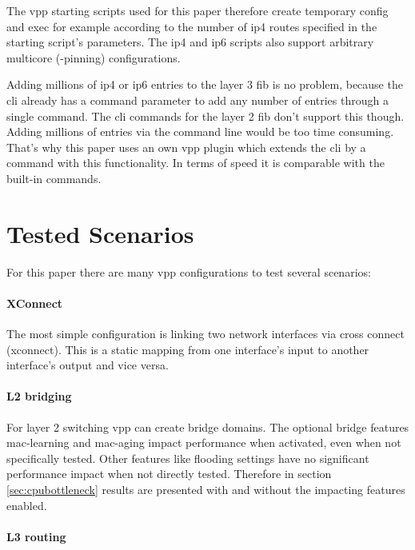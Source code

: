 The \Ac{vpp} starting scripts used for this paper therefore create
temporary \Ac{config} and \Ac{exec} for example according to the
number of \Ac{ip4} routes specified in the starting script's
parameters. The \Ac{ip4} and \Ac{ip6} scripts also support arbitrary
multicore (-pinning) configurations.


Adding millions of \Ac{ip4} or \Ac{ip6} entries to the layer 3
\Ac{fib} is no problem, because the \Ac{cli} already has a command
parameter to add any number of entries through a single command. The
\Ac{cli} commands for the layer 2 \Ac{fib} don't support this though.
Adding millions of entries via the command line would be too time
consuming. That's why this paper uses an own \Ac{vpp} plugin which
extends the \Ac{cli} by a command with this functionality. In terms of
speed it is comparable with the built-in commands.


\section{Tested Scenarios}

For this paper there are many \Ac{vpp} configurations to test several
scenarios:

\paragraph{XConnect} 

The most simple configuration is linking two network interfaces via
cross connect (xconnect). This is a static mapping from one
interface's input to another interface's output and vice versa.

\paragraph{L2 bridging}

For layer 2 switching \Ac{vpp} can create bridge domains. The optional
bridge features mac-learning and mac-aging impact performance when
activated, even when not specifically tested. Other features like
flooding settings have no significant performance impact when not
directly tested. Therefore in section \ref{sec:cpubottleneck} results
are presented with and without the impacting features enabled.

\paragraph{L3 routing}

